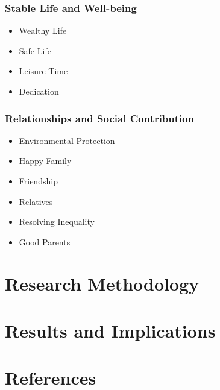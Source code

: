 \documentclass[12pt,a4paper]{article}
\begin{document}
\subsubsection{Stable Life and Well-being}
\begin{itemize}
    \item Wealthy Life
    \item Safe Life
    \item Leisure Time
    \item Dedication
\end{itemize}

\subsubsection{Relationships and Social Contribution}
\begin{itemize}
    \item Environmental Protection
    \item Happy Family
    \item Friendship
    \item Relatives
    \item Resolving Inequality
    \item Good Parents
\end{itemize}

\section{Research Methodology}

\section{Results and Implications}

\section{References}
\end{document}
